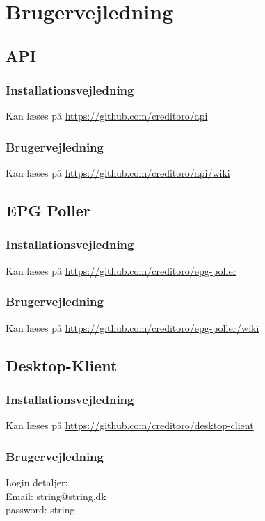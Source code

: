 \section{Brugervejledning}

\subsection{API}
\subsubsection{Installationsvejledning}
Kan læses på \url{https://github.com/creditoro/api}
\subsubsection{Brugervejledning}
Kan læses på \url{https://github.com/creditoro/api/wiki}

\subsection{EPG Poller}
\subsubsection{Installationsvejledning}
Kan læses på \url{https://github.com/creditoro/epg-poller}
\subsubsection{Brugervejledning}
Kan læses på \url{https://github.com/creditoro/epg-poller/wiki}

\subsection{Desktop-Klient}
\subsubsection{Installationsvejledning}
Kan læses på \url{https://github.com/creditoro/desktop-client}
\subsubsection{Brugervejledning}
Login detaljer:\\
Email: string@string.dk\\
password: string\\

